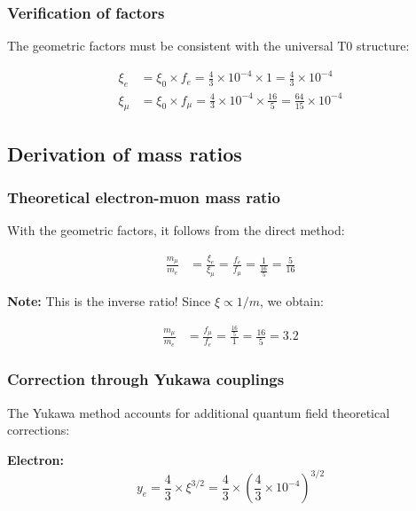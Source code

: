 \documentclass[12pt,a4paper]{article}
\begin{document}
\subsubsection{Verification of factors}

The geometric factors must be consistent with the universal T0 structure:

\begin{align}
	\xi_e &= \xi_0 \times f_e = \frac{4}{3} \times 10^{-4} \times 1 = \frac{4}{3} \times 10^{-4}\\
	\xi_\mu &= \xi_0 \times f_\mu = \frac{4}{3} \times 10^{-4} \times \frac{16}{5} = \frac{64}{15} \times 10^{-4}
\end{align}

\subsection{Derivation of mass ratios}

\subsubsection{Theoretical electron-muon mass ratio}

With the geometric factors, it follows from the direct method:

\begin{align}
	\frac{m_\mu}{m_e} &= \frac{\xi_e}{\xi_\mu} = \frac{f_e}{f_\mu} = \frac{1}{\frac{16}{5}} = \frac{5}{16}
\end{align}

\textbf{Note:} This is the inverse ratio! Since $\xi \propto 1/m$, we obtain:

\begin{align}
	\frac{m_\mu}{m_e} &= \frac{f_\mu}{f_e} = \frac{\frac{16}{5}}{1} = \frac{16}{5} = 3.2
\end{align}

\subsubsection{Correction through Yukawa couplings}

The Yukawa method accounts for additional quantum field theoretical corrections:

\textbf{Electron:}
\begin{equation}
	y_e = \frac{4}{3} \times \xi^{3/2} = \frac{4}{3} \times \left(\frac{4}{3} \times 10^{-4}\right)^{3/2}
\end{equation}
\end{document}
